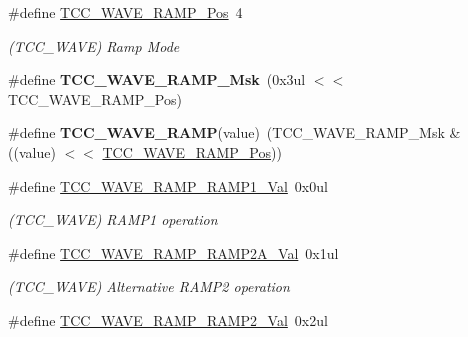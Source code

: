 \begin{DoxyCompactItemize}
\item 
\hypertarget{group___s_a_m_l21___t_c_c_ga6613e2e13c814033e2509897a20ee96c}{}\#define \hyperlink{group___s_a_m_l21___t_c_c_ga6613e2e13c814033e2509897a20ee96c}{T\+C\+C\+\_\+\+W\+A\+V\+E\+\_\+\+R\+A\+M\+P\+\_\+\+Pos}~4\label{group___s_a_m_l21___t_c_c_ga6613e2e13c814033e2509897a20ee96c}

\begin{DoxyCompactList}\small\item\em (T\+C\+C\+\_\+\+W\+A\+V\+E) Ramp Mode \end{DoxyCompactList}\item 
\hypertarget{group___s_a_m_l21___t_c_c_gaffa294dd4055f796932f77c0390f90ce}{}\#define {\bfseries T\+C\+C\+\_\+\+W\+A\+V\+E\+\_\+\+R\+A\+M\+P\+\_\+\+Msk}~(0x3ul $<$$<$ T\+C\+C\+\_\+\+W\+A\+V\+E\+\_\+\+R\+A\+M\+P\+\_\+\+Pos)\label{group___s_a_m_l21___t_c_c_gaffa294dd4055f796932f77c0390f90ce}

\item 
\hypertarget{group___s_a_m_l21___t_c_c_ga3ac4d7a54746c84292e1a2b4b347e22d}{}\#define {\bfseries T\+C\+C\+\_\+\+W\+A\+V\+E\+\_\+\+R\+A\+M\+P}(value)~(T\+C\+C\+\_\+\+W\+A\+V\+E\+\_\+\+R\+A\+M\+P\+\_\+\+Msk \& ((value) $<$$<$ \hyperlink{group___s_a_m_l21___t_c_c_ga6613e2e13c814033e2509897a20ee96c}{T\+C\+C\+\_\+\+W\+A\+V\+E\+\_\+\+R\+A\+M\+P\+\_\+\+Pos}))\label{group___s_a_m_l21___t_c_c_ga3ac4d7a54746c84292e1a2b4b347e22d}

\item 
\hypertarget{group___s_a_m_l21___t_c_c_ga0fddbb1bb391e4ae73fb6e978d626fdf}{}\#define \hyperlink{group___s_a_m_l21___t_c_c_ga0fddbb1bb391e4ae73fb6e978d626fdf}{T\+C\+C\+\_\+\+W\+A\+V\+E\+\_\+\+R\+A\+M\+P\+\_\+\+R\+A\+M\+P1\+\_\+\+Val}~0x0ul\label{group___s_a_m_l21___t_c_c_ga0fddbb1bb391e4ae73fb6e978d626fdf}

\begin{DoxyCompactList}\small\item\em (T\+C\+C\+\_\+\+W\+A\+V\+E) R\+A\+M\+P1 operation \end{DoxyCompactList}\item 
\hypertarget{group___s_a_m_l21___t_c_c_ga39b1a663ed2f07f3c442b477a73b284c}{}\#define \hyperlink{group___s_a_m_l21___t_c_c_ga39b1a663ed2f07f3c442b477a73b284c}{T\+C\+C\+\_\+\+W\+A\+V\+E\+\_\+\+R\+A\+M\+P\+\_\+\+R\+A\+M\+P2\+A\+\_\+\+Val}~0x1ul\label{group___s_a_m_l21___t_c_c_ga39b1a663ed2f07f3c442b477a73b284c}

\begin{DoxyCompactList}\small\item\em (T\+C\+C\+\_\+\+W\+A\+V\+E) Alternative R\+A\+M\+P2 operation \end{DoxyCompactList}\item 
\hypertarget{group___s_a_m_l21___t_c_c_gac027d349051870d126b5e8f50216e04d}{}\#define \hyperlink{group___s_a_m_l21___t_c_c_gac027d349051870d126b5e8f50216e04d}{T\+C\+C\+\_\+\+W\+A\+V\+E\+\_\+\+R\+A\+M\+P\+\_\+\+R\+A\+M\+P2\+\_\+\+Val}~0x2ul\label{group___s_a_m_l21___t_c_c_gac027d349051870d126b5e8f50216e04d}


\end{DoxyCompactItemize}
